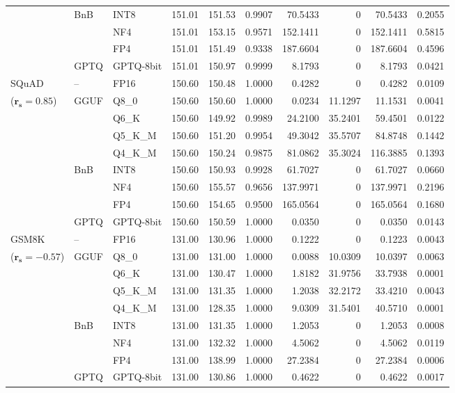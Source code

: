 \begin{longtable}{ll l rrrrrrr}
 & BnB & INT8 & 151.01 & 151.53 & 0.9907 & 70.5433 & \cellcolor{cyan!12} $0$ & 70.5433 & 0.2055 \\
 &  & NF4 & 151.01 & 153.15 & 0.9571 & 152.1411 & \cellcolor{cyan!12} $0$ & 152.1411 & 0.5815 \\
 &  & FP4 & 151.01 & 151.49 & \cellcolor{red!18} 0.9338 & \cellcolor{red!18} 187.6604 & \cellcolor{cyan!12} $0$ & \cellcolor{red!18} 187.6604 & \cellcolor{red!18} 0.4596 \\
 & GPTQ & GPTQ-8bit & 151.01 & 150.97 & 0.9999 & 8.1793 & \cellcolor{cyan!12} $0$ & 8.1793 & 0.0421 \\
\midrule
SQuAD & -- & FP16 & 150.60 & 150.48 & 1.0000 & 0.4282 & \cellcolor{cyan!12} $0$ & 0.4282 & 0.0109 \\
{\small ($\mathbf{r_s{=}0.85}$)} & GGUF & Q8\_0 & 150.60 & 150.60 & 1.0000 & 0.0234 & 11.1297 & 11.1531 & 0.0041 \\
 &  & Q6\_K & 150.60 & 149.92 & 0.9989 & 24.2100 & 35.2401 & 59.4501 & 0.0122 \\
 &  & Q5\_K\_M & 150.60 & 151.20 & 0.9954 & 49.3042 & 35.5707 & 84.8748 & 0.1442 \\
 &  & Q4\_K\_M & 150.60 & 150.24 & 0.9875 & 81.0862 & 35.3024 & 116.3885 & 0.1393 \\
 & BnB & INT8 & 150.60 & 150.93 & 0.9928 & 61.7027 & \cellcolor{cyan!12} $0$ & 61.7027 & 0.0660 \\
 &  & NF4 & 150.60 & 155.57 & 0.9656 & 137.9971 & \cellcolor{cyan!12} $0$ & 137.9971 & 0.2196 \\
 &  & FP4 & 150.60 & 154.65 & 0.9500 & 165.0564 & \cellcolor{cyan!12} $0$ & 165.0564 & 0.1680 \\
 & GPTQ & GPTQ-8bit & 150.60 & 150.59 & 1.0000 & 0.0350 & \cellcolor{cyan!12} $0$ & 0.0350 & 0.0143 \\
\midrule
GSM8K & -- & FP16 & 131.00 & 130.96 & 1.0000 & 0.1222 & \cellcolor{cyan!12} $0$ & 0.1223 & 0.0043 \\
{\small ($\mathbf{r_s{=}-0.57}$)} & GGUF & Q8\_0 & 131.00 & 131.00 & 1.0000 & 0.0088 & 10.0309 & 10.0397 & 0.0063 \\
 &  & Q6\_K & 131.00 & 130.47 & 1.0000 & 1.8182 & 31.9756 & 33.7938 & 0.0001 \\
 &  & Q5\_K\_M & 131.00 & 131.35 & 1.0000 & 1.2038 & 32.2172 & 33.4210 & 0.0043 \\
 &  & Q4\_K\_M & 131.00 & 128.35 & 1.0000 & 9.0309 & 31.5401 & 40.5710 & 0.0001 \\
 & BnB & INT8 & 131.00 & 131.35 & 1.0000 & 1.2053 & \cellcolor{cyan!12} $0$ & 1.2053 & 0.0008 \\
 &  & NF4 & 131.00 & 132.32 & 1.0000 & 4.5062 & \cellcolor{cyan!12} $0$ & 4.5062 & 0.0119 \\
 &  & FP4 & 131.00 & 138.99 & 1.0000 & 27.2384 & \cellcolor{cyan!12} $0$ & 27.2384 & 0.0006 \\
 & GPTQ & GPTQ-8bit & 131.00 & 130.86 & 1.0000 & 0.4622 & \cellcolor{cyan!12} $0$ & 0.4622 & 0.0017 \\
\end{longtable}
\endgroup